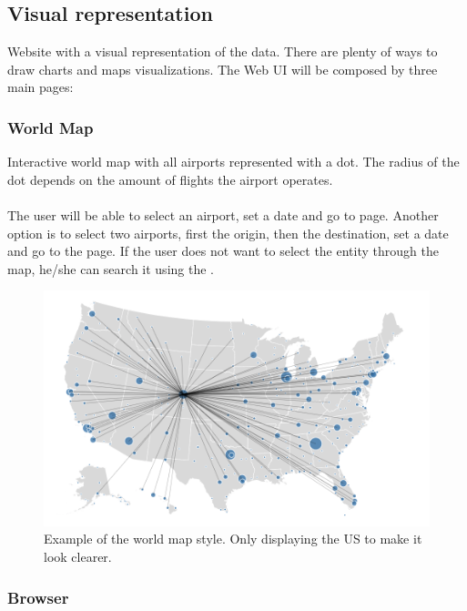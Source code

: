 \subsection{Visual representation} \label{visual_representation}

Website with a visual representation of the data. There are plenty of ways to draw charts and maps visualizations. The Web UI will be composed by three main pages:

\subsubsection*{World Map}

Interactive world map with all airports represented with a dot. The radius of the dot depends on the amount of flights the airport operates.
\\\\
The \thesistitle user will be able to select an airport, set a date and go to  page. Another option is to select two airports, first the origin, then the destination, set a date and go to the  page. If the user does not want to select the entity through the map, he/she can search it using the .

\begin{figure}[H]
\centering
\includegraphics[scale=0.2]{resources/us-map-example01.png}
\caption{Example of the world map style. Only displaying the US to make it look clearer.}
\end{figure}

\subsubsection*{Browser} \label{browser}

